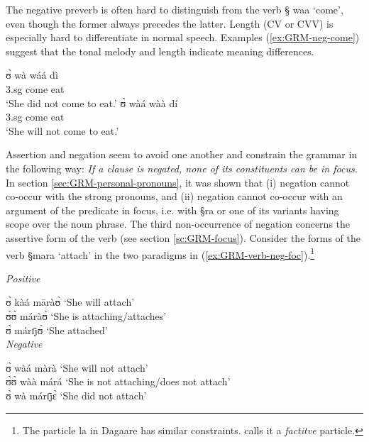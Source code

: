 The negative preverb is often hard to distinguish from the verb  {\S
waa} `come',  even though the former always precedes the latter. Length (CV or
CVV) is especially hard to differentiate in normal speech. Examples
(\ref{ex:GRM-neg-come}) suggest that the tonal melody and length  indicate
meaning differences.


\begin{exe}
\ex\label{ex:GRM-neg-come}
 \begin{xlist}
  
\ex\label{}
\gll ʊ̀ wà wáá dì\\
{\sc 3.sg} {\neg} come eat\\
\glt `She did not come to eat.'
\ex\label{}
\gll ʊ̀ wàá wàà dí\\
{\sc 3.sg} {\neg} come eat \\
\glt `She will not come to eat.'
\end{xlist}
\end{exe}

Assertion and negation seem to avoid one another and constrain the grammar  in
the following way:  {\it If a clause is negated,  none of its constituents can
be in focus.} In section \ref{sec:GRM-personal-pronouns},  it was shown that (i)
negation cannot co-occur with the strong pronouns, and (ii) negation cannot
co-occur with an argument of the predicate in focus, i.e. with {\S ra} or one of
its variants having scope over the noun phrase. The third non-occurrence of
negation concerns  the assertive form of the verb (see section
\ref{sc:GRM-focus}).  Consider the forms of the verb {\S mara} `attach' in the
two paradigms in (\ref{ex:GRM-verb-neg-foc}).\footnote{The particle {\F la} in
Dagaare has similar constraints. \citet[94]{Bodo97} calls it a {\it factitve}
particle.}

\begin{exe}
   \ex\label{ex:GRM-verb-neg-foc}
\begin{xlist}
   \ex\label{ex:GRM-verb-neg-foc-pos}{\it Positive}

 ʊ̀ kàá māràʊ̀   `She will attach'\\
  ʊ̀ʊ̀ máràʊ̀     	 `She  is attaching/attaches'\\
  ʊ̀ márɪ̄jʊ̀       `She   attached'\\
  \ex\label{ex:GRM-verb-neg-foc-neg}{\it Negative}

 ʊ̀ wàá màrà  `She will not attach'\\
   ʊ̀ʊ̀ wàà márá  	 `She  is  not attaching/does not attach'\\
  ʊ̀ wà márɪ̄jɛ̀   `She   did not attach'\\

\end{xlist}
\end{exe}

